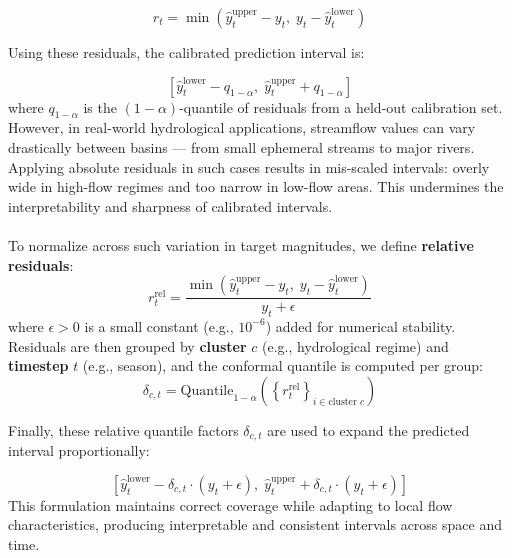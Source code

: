 \documentclass[a4paper,12pt]{article}
\begin{document}
\begin{equation}
r_t = \min\left( \hat{y}_t^{\text{upper}} - y_t,\; y_t - \hat{y}_t^{\text{lower}} \right)
\label{eq:absolute_residual}
\end{equation}

\noindent Using these residuals, the calibrated prediction interval is:

\begin{equation}
\left[ \hat{y}_t^{\text{lower}} - q_{1-\alpha},\; \hat{y}_t^{\text{upper}} + q_{1-\alpha} \right]
\label{eq:standard_interval}
\end{equation}
where $q_{1-\alpha}$ is the $(1 - \alpha)$-quantile of residuals from a held-out calibration set.
\\
\noindent However, in real-world hydrological applications, streamflow values can vary drastically 
between basins — from small ephemeral streams to major rivers. Applying absolute residuals in such 
cases results in mis-scaled intervals: overly wide in high-flow regimes and too narrow in low-flow areas. 
This undermines the interpretability and sharpness of calibrated intervals.
\\ \\ 
To normalize across such variation in target magnitudes, we define \textbf{relative residuals}:
\begin{equation}
r_t^{\text{rel}} = \frac{\min\left( \hat{y}_t^{\text{upper}} - y_t,\; y_t - \hat{y}_t^{\text{lower}} \right)}{y_t + \epsilon}
\label{eq:relative_residual}
\end{equation}
where $\epsilon > 0$ is a small constant (e.g., $10^{-6}$) added for numerical stability.
\\
Residuals are then grouped by \textbf{cluster} $c$ (e.g., hydrological regime) and \textbf{timestep} 
$t$ (e.g., season), and the conformal quantile is computed per group:
\begin{equation}
\delta_{c, t} = \text{Quantile}_{1 - \alpha} \left( \left\{ r_t^{\text{rel}} \right\}_{i \in \text{cluster } c} \right)
\label{eq:cluster_quantile}
\end{equation}

\noindent Finally, these relative quantile factors $\delta_{c, t}$ are used to expand the predicted interval proportionally:

\begin{equation}
\left[
\hat{y}_t^{\text{lower}} - \delta_{c, t} \cdot (y_t + \epsilon),\;
\hat{y}_t^{\text{upper}} + \delta_{c, t} \cdot (y_t + \epsilon)
\right]
\label{eq:relative_interval}
\end{equation}
\noindent This formulation maintains correct coverage while adapting to local flow characteristics, producing interpretable and consistent intervals across space and time.
\end{document}
